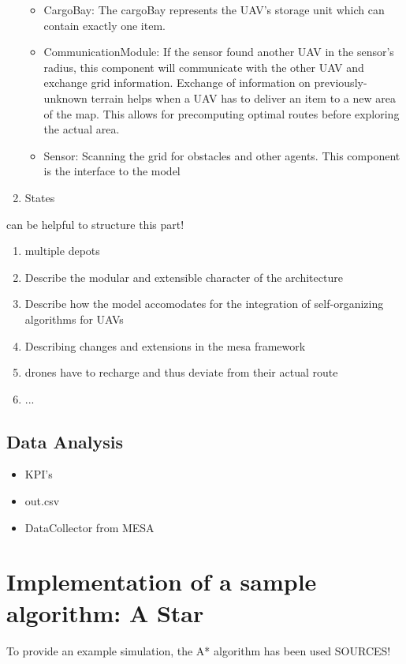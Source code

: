 \begin{enumerate}
\begin{itemize}
		\item CargoBay: The cargoBay represents the UAV's storage unit which can contain exactly one item.
		\item CommunicationModule: If the sensor found another UAV in the sensor's radius, this component will communicate with the other UAV and exchange grid information. Exchange of information on previously-unknown terrain helps when a UAV has to deliver an item to a new area of the map. This allows for precomputing optimal routes before exploring the actual area.
		\item Sensor: Scanning the grid for obstacles and other agents. This component is the interface to the model
	\end{itemize}
	\item States

\end{enumerate}


\cite{jang.2005} can be helpful to structure this part!


\begin{enumerate}
	\item multiple depots
	\item Describe the modular and extensible character of the architecture
	\item Describe how the model accomodates for the integration of self-organizing algorithms for UAVs
	\item Describing changes and extensions in the mesa framework
	\item drones have to recharge and thus deviate from their actual route
	\item ...
	
\end{enumerate}


\subsection{Data Analysis}
\begin{itemize}
	\item KPI's
	\item out.csv
	\item DataCollector from MESA
	
\end{itemize}

\section{Implementation of a sample algorithm: A Star}\label{sec:algorithm}
To provide an example simulation, the A* algorithm has been used 
SOURCES!


